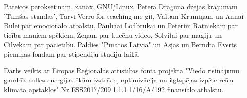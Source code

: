 Pateicos paroksetīnam, xanax, GNU/Linux, Pētera Draguna dzejas krājumam 'Tumšās stundas', Tarvi Verro for teaching me git, Valtam Krūmiņam un Annai Bulei par emocionālo atbalstu, Paulīnai Lodbrukai un Pēterim Ratniekam par ticību maniem spēkiem, Žeņam par kucēnu video, Solvitai par maģiju un Cilvēkam par pacietību. Paldies "Puratos Latvia" un Asjas un Berndta Everts piemiņas fondam par stipendiju studiju laikā.

Darbs veikts ar Eiropas Reģionālās attīstības fonta projekta "Viedo risinājumu gandrīz nulles enerģijas ēkām izstrāde, optimizācija un ilgtspējas izpēte reāla klimata apstākļos" Nr ESS2017/209 1.1.1.1/16/A/192 finansiālo atbalstu.
